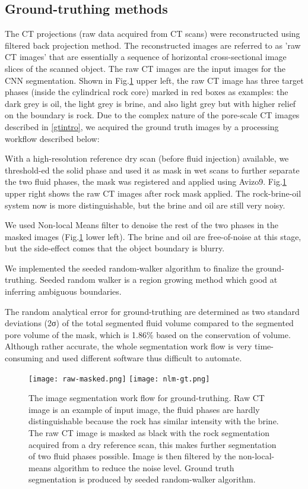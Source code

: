 \documentclass[draft,linenumbers]{agujournal2018}
\begin{document}
\subsection{Ground-truthing methods}\label{gtmethod}
The CT projections (raw data acquired from CT scans) were reconstructed using filtered back projection method. The reconstructed images are referred to as 'raw CT images' that are essentially a sequence of horizontal cross-sectional image slices of the scanned object. The raw CT images are the input images for the CNN segmentation. Shown in Fig.\ref{prep} upper left, the raw CT image has three target phases (inside the cylindrical rock core) marked in red boxes as examples: the dark grey is oil, the light grey is brine, and also light grey but with higher relief on the boundary is rock. Due to the complex nature of the pore-scale CT images described in \ref{gtintro}, we acquired the ground truth images by a processing workflow described below:

With a high-resolution reference dry scan (before fluid injection) available, we threshold-ed the solid phase and used it as mask in wet scans to further separate the two fluid phases, the mask was registered and applied using Avizo9\texttrademark. Fig.\ref{prep} upper right shows the raw CT images after rock mask applied. The rock-brine-oil system now is more distinguishable, but the brine and oil are still very noisy.
 
We used Non-local Means filter to denoise the rest of the two phases in the masked images (Fig.\ref{prep} lower left). The brine and oil are free-of-noise at this stage, but the side-effect comes that the object boundary is blurry.

We implemented the seeded random-walker algorithm \citep{grady2006random} to finalize the ground-truthing. Seeded random walker is a region growing method which good at inferring ambiguous boundaries. 

The random analytical error for ground-truthing are determined as two standard deviations (2σ) of the total segmented fluid volume compared to the segmented pore volume of the mask, which is 1.86\% based on the conservation of volume. Although rather accurate, the whole segmentation work flow is very time-consuming and used different software thus difficult to automate. 

\begin{figure}[h]
\centering
\texttt{[image: raw-masked.png]}
\texttt{[image: nlm-gt.png]}
\caption{The image segmentation work flow for ground-truthing. Raw CT image is an example of input image, the fluid phases are hardly distinguishable because the rock has similar intensity with the brine. The raw CT image is masked as black with the rock segmentation acquired from a dry reference scan, this makes further segmentation of two fluid phases possible. Image is then filtered by the non-local-means algorithm to reduce the noise level. Ground truth segmentation is produced by seeded random-walker algorithm.}
\label{prep}
\end{figure}
\end{document}
